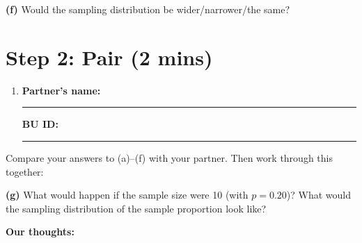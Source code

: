 \documentclass{article}
\newcommand{\nameblank}{\rule{1.75in}{0.4pt}}
\newcommand{\idblank}{\rule{1.55in}{0.4pt}}
\begin{document}
\textbf{(f)} Would the sampling distribution be wider/narrower/the same?
\vspace{0.4in}

\newpage
\section*{Step 2: Pair (2 mins)}

\begin{enumerate}[label=\arabic*.,leftmargin=*,itemsep=.7em, start=2]
  \item \textbf{Partner's name:} \nameblank \hfill \textbf{BU ID:} \idblank
\end{enumerate}

Compare your answers to (a)--(f) with your partner. Then work through this together:

\textbf{(g)} What would happen if the sample size were 10 (with $p=0.20$)? What would the sampling distribution of the sample proportion look like?
\vspace{0.6in}

\textbf{Our thoughts:}
\vfill
\end{document}
